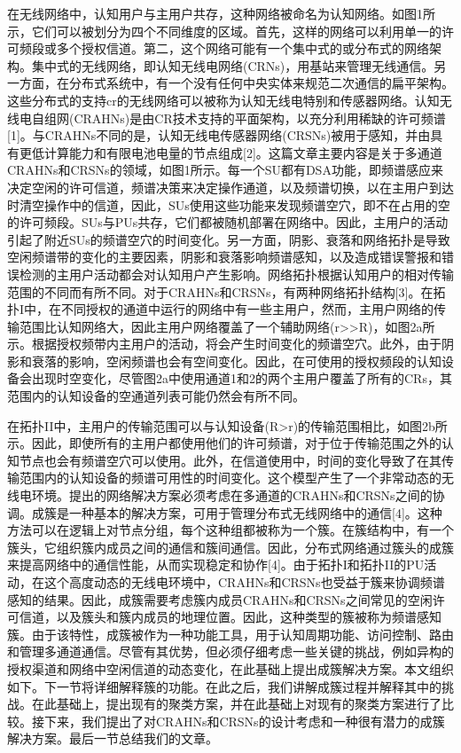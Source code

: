 \documentclass[a4paper,AutoFakeBold,oneside,12pt]{book}
\begin{document}
  在无线网络中，认知用户与主用户共存，这种网络被命名为认知网络。如图1所示，它们可以被划分为四个不同维度的区域。首先，这样的网络可以利用单一的许可频段或多个授权信道。第二，这个网络可能有一个集中式的或分布式的网络架构。集中式的无线网络，即认知无线电网络(CRNs)，用基站来管理无线通信。另一方面，在分布式系统中，有一个没有任何中央实体来规范二次通信的扁平架构。这些分布式的支持cr的无线网络可以被称为认知无线电特别和传感器网络。认知无线电自组网(CRAHNs)是由CR技术支持的平面架构，以充分利用稀缺的许可频谱[1]。与CRAHNs不同的是，认知无线电传感器网络(CRSNs)被用于感知，并由具有更低计算能力和有限电池电量的节点组成[2]。这篇文章主要内容是关于多通道CRAHNs和CRSNs的领域，如图1所示。每一个SU都有DSA功能，即频谱感应来决定空闲的许可信道，频谱决策来决定操作通道，以及频谱切换，以在主用户到达时清空操作中的信道，因此，SUs使用这些功能来发现频谱空穴，即不在占用的空的许可频段。SUs与PUs共存，它们都被随机部署在网络中。因此，主用户的活动引起了附近SUs的频谱空穴的时间变化。另一方面，阴影、衰落和网络拓扑是导致空闲频谱带的变化的主要因素，阴影和衰落影响频谱感知，以及造成错误警报和错误检测的主用户活动都会对认知用户产生影响。网络拓扑根据认知用户的相对传输范围的不同而有所不同。对于CRAHNs和CRSNs，有两种网络拓扑结构[3]。在拓扑I中，在不同授权的通道中运行的网络中有一些主用户，然而，主用户网络的传输范围比认知网络大，因此主用户网络覆盖了一个辅助网络(r>>R)，如图2a所示。根据授权频带内主用户的活动，将会产生时间变化的频谱空穴。此外，由于阴影和衰落的影响，空闲频谱也会有空间变化。因此，在可使用的授权频段的认知设备会出现时空变化，尽管图2a中使用通道1和2的两个主用户覆盖了所有的CRs，其范围内的认知设备的空通道列表可能仍然会有所不同。
  
  在拓扑II中，主用户的传输范围可以与认知设备(R>r)的传输范围相比，如图2b所示。因此，即使所有的主用户都使用他们的许可频谱，对于位于传输范围之外的认知节点也会有频谱空穴可以使用。此外，在信道使用中，时间的变化导致了在其传输范围内的认知设备的频谱可用性的时间变化。这个模型产生了一个非常动态的无线电环境。提出的网络解决方案必须考虑在多通道的CRAHNs和CRSNs之间的协调。成簇是一种基本的解决方案，可用于管理分布式无线网络中的通信[4]。这种方法可以在逻辑上对节点分组，每个这种组都被称为一个簇。在簇结构中，有一个簇头，它组织簇内成员之间的通信和簇间通信。因此，分布式网络通过簇头的成簇来提高网络中的通信性能，从而实现稳定和协作[4]。由于拓扑I和拓扑II的PU活动，在这个高度动态的无线电环境中，CRAHNs和CRSNs也受益于簇来协调频谱感知的结果。因此，成簇需要考虑簇内成员CRAHNs和CRSNs之间常见的空闲许可信道，以及簇头和簇内成员的地理位置。因此，这种类型的簇被称为频谱感知簇。由于该特性，成簇被作为一种功能工具，用于认知周期功能、访问控制、路由和管理多通道通信。尽管有其优势，但必须仔细考虑一些关键的挑战，例如异构的授权渠道和网络中空闲信道的动态变化，在此基础上提出成簇解决方案。本文组织如下。下一节将详细解释簇的功能。在此之后，我们讲解成簇过程并解释其中的挑战。在此基础上，提出现有的聚类方案，并在此基础上对现有的聚类方案进行了比较。接下来，我们提出了对CRAHNs和CRSNs的设计考虑和一种很有潜力的成簇解决方案。最后一节总结我们的文章。
\end{document}
